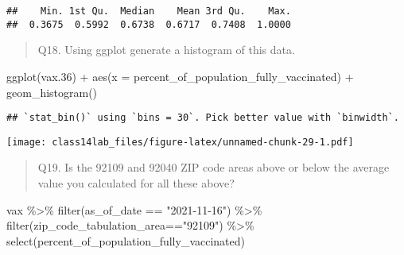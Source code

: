 \documentclass[
]{article}
\newenvironment{Shaded}{\begin{snugshade}}{\end{snugshade}}
\newcommand{\AttributeTok}[1]{\textcolor[rgb]{0.77,0.63,0.00}{#1}}
\newcommand{\FloatTok}[1]{\textcolor[rgb]{0.00,0.00,0.81}{#1}}
\newcommand{\FunctionTok}[1]{\textcolor[rgb]{0.00,0.00,0.00}{#1}}
\newcommand{\NormalTok}[1]{#1}
\newcommand{\SpecialCharTok}[1]{\textcolor[rgb]{0.00,0.00,0.00}{#1}}
\newcommand{\StringTok}[1]{\textcolor[rgb]{0.31,0.60,0.02}{#1}}
\begin{document}
\begin{Shaded}
\end{Shaded}

\begin{verbatim}
##    Min. 1st Qu.  Median    Mean 3rd Qu.    Max. 
##  0.3675  0.5992  0.6738  0.6717  0.7408  1.0000
\end{verbatim}

\begin{quote}
Q18. Using ggplot generate a histogram of this data.
\end{quote}

\begin{Shaded}
\begin{Highlighting}[]
\FunctionTok{ggplot}\NormalTok{(vax}\FloatTok{.36}\NormalTok{) }\SpecialCharTok{+}
  \FunctionTok{aes}\NormalTok{(}\AttributeTok{x =}\NormalTok{ percent\_of\_population\_fully\_vaccinated) }\SpecialCharTok{+}
  \FunctionTok{geom\_histogram}\NormalTok{()}
\end{Highlighting}
\end{Shaded}

\begin{verbatim}
## `stat_bin()` using `bins = 30`. Pick better value with `binwidth`.
\end{verbatim}

\texttt{[image: class14lab\_files/figure-latex/unnamed-chunk-29-1.pdf]}

\begin{quote}
Q19. Is the 92109 and 92040 ZIP code areas above or below the average
value you calculated for all these above?
\end{quote}

\begin{Shaded}
\begin{Highlighting}[]
\NormalTok{vax }\SpecialCharTok{\%\textgreater{}\%} \FunctionTok{filter}\NormalTok{(as\_of\_date }\SpecialCharTok{==} \StringTok{"2021{-}11{-}16"}\NormalTok{) }\SpecialCharTok{\%\textgreater{}\%}  
  \FunctionTok{filter}\NormalTok{(zip\_code\_tabulation\_area}\SpecialCharTok{==}\StringTok{"92109"}\NormalTok{) }\SpecialCharTok{\%\textgreater{}\%}
  \FunctionTok{select}\NormalTok{(percent\_of\_population\_fully\_vaccinated)}
\end{Highlighting}
\end{Shaded}
\end{document}
